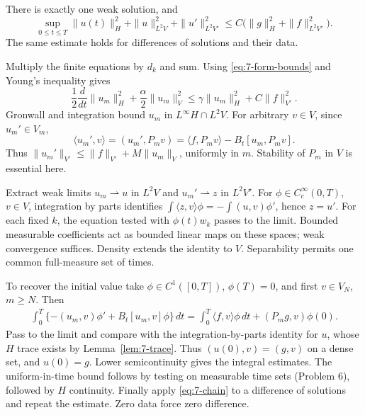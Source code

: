 \Needspace{55mm}
\begin{theorem}
\label{thm:7-parabolic-existence}
There is exactly one weak solution, and
\begin{equation}\label{eq:7-parabolic-energy}
 \sup_{0\leq t\leq T}\|u(t)\|_H^2+
 \|u\|_{L^2V}^2+\|u'\|_{L^2V'}^2
 \leq C\big(\|g\|_H^2+\|f\|_{L^2V'}^2\big).
\end{equation}
The same estimate holds for differences of solutions and their data.
\end{theorem}
\begin{expandedproof}
Multiply the finite equations by $d_k$ and sum. Using
\eqref{eq:7-form-bounds} and Young's inequality gives
\[
 \frac12\frac d{dt}\|u_m\|_H^2+
 \frac\alpha2\|u_m\|_V^2
 \leq\gamma\|u_m\|_H^2+C\|f\|_{V'}^2.
\]
Gronwall and integration bound $u_m$ in $L^\infty H\cap L^2V$.
For arbitrary $v\in V$, since $u_m'\in V_m$,
\[
 \langle u_m',v\rangle=(u_m',P_m v)
 =\langle f,P_m v\rangle-B_t[u_m,P_m v].
\]
Thus $\|u_m'\|_{V'}\leq\|f\|_{V'}+M\|u_m\|_V$, uniformly in $m$.
Stability of $P_m$ in $V$ is essential here.

Extract weak limits $u_m\rightharpoonup u$ in $L^2V$ and
$u_m'\rightharpoonup z$ in $L^2V'$. For $\phi\in C_c^\infty(0,T)$,
$v\in V$, integration by parts identifies
$\int\langle z,v\rangle\phi=-\int(u,v)\phi'$, hence $z=u'$.
For each fixed $k$, the equation tested with $\phi(t)w_k$ passes to the
limit. Bounded measurable coefficients act as bounded linear maps on
these spaces; weak convergence suffices. Density extends the identity
to $V$. Separability permits one common full-measure set of times.

To recover the initial value take $\phi\in C^1([0,T])$, $\phi(T)=0$,
and first $v\in V_N$, $m\geq N$. Then
\[
 \begin{split}
 \int_0^T\{- (u_m,v)\phi'+B_t[u_m,v]\phi\}\,dt
 =\int_0^T\langle f,v\rangle\phi\,dt+(P_mg,v)\phi(0).
 \end{split}
\]
Pass to the limit and compare with the integration-by-parts identity for
$u$, whose $H$ trace exists by Lemma~\ref{lem:7-trace}. Thus
$(u(0),v)=(g,v)$ on a dense set, and $u(0)=g$.
Lower semicontinuity gives the integral estimates. The uniform-in-time
bound follows by testing on measurable time sets (Problem 6), followed
by $H$ continuity. Finally apply \eqref{eq:7-chain} to a difference of
solutions and repeat the estimate. Zero data force zero difference.
\end{expandedproof}
\Needspace{55mm}


